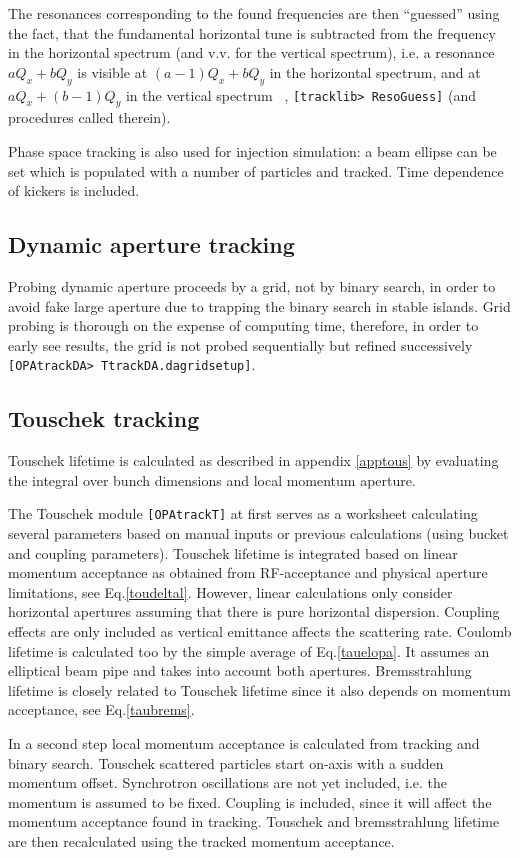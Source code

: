 \documentclass[12pt]{article}
\newcommand\code[1]{{\tt [#1]}}
\begin{document}
The resonances corresponding to the found frequencies are then ``guessed'' using the fact, that the fundamental horizontal tune is subtracted from the frequency in the horizontal spectrum (and v.v. for the vertical spectrum), i.e. a resonance $aQ_x+bQ_y$ is visible at $(a-1)Q_x+bQ_y$ in the horizontal spectrum, and at $aQ_x+(b-1)Q_y$ in the vertical spectrum ~\cite{jbthesis}, \code{tracklib> ResoGuess} (and procedures called therein).

Phase space tracking is also used for injection simulation: a beam ellipse can be set which is populated with a number of particles and tracked. Time dependence of kickers is included.


\subsection{Dynamic aperture tracking}
Probing dynamic aperture proceeds by a grid, not by binary search, in order to avoid fake large aperture due to trapping the binary search in stable islands. Grid probing is thorough on the expense of computing time, therefore, in order to early see results, the grid is not probed sequentially but refined successively \code{OPAtrackDA> TtrackDA.dagridsetup}.

\subsection{Touschek tracking}
Touschek lifetime is calculated as described in appendix \ref{apptous} by evaluating the integral over bunch dimensions and local momentum aperture.

The Touschek module \code{OPAtrackT} at first serves as a worksheet calculating several parameters based on manual inputs or previous calculations (using bucket and coupling parameters). Touschek lifetime is integrated based on linear momentum acceptance as obtained from RF-acceptance and physical aperture limitations, see Eq.\ref{toudeltal}. However, linear calculations only consider horizontal apertures assuming that there is pure horizontal dispersion. Coupling effects are only included as vertical emittance affects the scattering rate.
Coulomb lifetime is calculated too by the simple average of Eq.\ref{tauelopa}. It assumes an elliptical beam pipe and takes into account both apertures. Bremsstrahlung lifetime is closely related to Touschek lifetime since it also depends on momentum acceptance, see Eq.\ref{taubrems}.

In a second step local momentum acceptance is calculated from tracking and binary search. Touschek scattered particles start on-axis with a sudden momentum offset. Synchrotron oscillations are not yet included, i.e. the momentum is assumed to be fixed. Coupling is included, since it will affect the momentum acceptance found in tracking. Touschek and bremsstrahlung lifetime are then recalculated using the tracked momentum acceptance.
\end{document}
